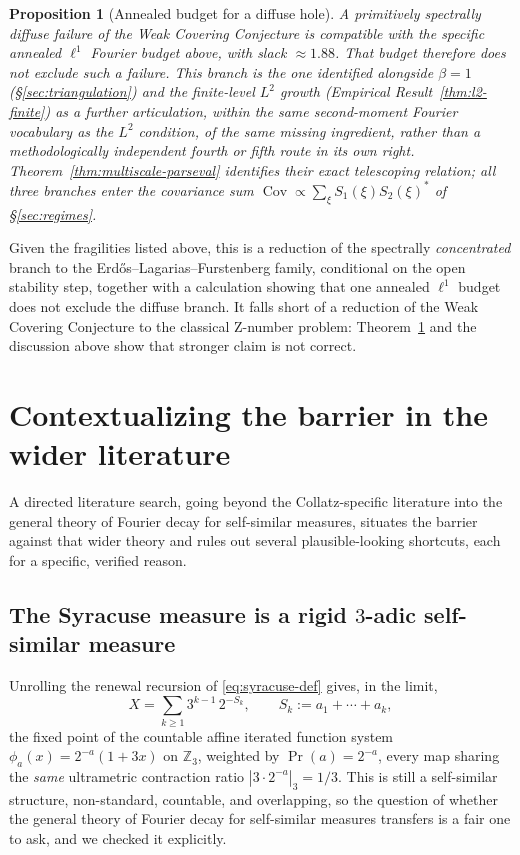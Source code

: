 \documentclass[11pt]{article}
\newtheorem{proposition}[theorem]{Proposition}
\theoremstyle{definition}
\theoremstyle{remark}
\DeclareMathOperator{\Cov}{Cov}
\begin{document}
\begin{proposition}[Annealed budget for a diffuse hole]
\label{thm:propC}
A primitively spectrally diffuse failure of the Weak Covering Conjecture is
compatible with the specific annealed $\ell^1$ Fourier budget above,
with slack $\approx 1.88$. That budget therefore does not exclude such
a failure. This branch is the one identified alongside $\beta=1$
(\S\ref{sec:triangulation}) and the finite-level $L^2$ growth
(Empirical Result~\ref{thm:l2-finite}) as a further articulation,
within the same second-moment Fourier vocabulary as the $L^2$
condition, of the same missing ingredient, rather than a
methodologically independent fourth or fifth route in its own right.
Theorem~\ref{thm:multiscale-parseval} identifies their exact
telescoping relation; all three branches enter the covariance sum
$\Cov\propto\sum_\xi S_1(\xi)S_2(\xi)^\ast$ of \S\ref{sec:regimes}.
\end{proposition}

Given the fragilities listed above, this is a reduction of the
spectrally \emph{concentrated} branch to the Erdős--Lagarias--Furstenberg
family, conditional on the open stability step, together with a
calculation showing that one annealed $\ell^1$ budget does not exclude
the diffuse branch. It falls short of a reduction of the Weak Covering
Conjecture to the classical Z-number problem: Theorem~\ref{thm:propC}
and the discussion above show that stronger claim is not correct.

\section{Contextualizing the barrier in the wider literature}
\label{sec:context}

A directed literature search, going beyond the Collatz-specific
literature into the general theory of Fourier decay for self-similar
measures, situates the barrier against that wider theory and rules out
several plausible-looking shortcuts, each for a specific, verified
reason.

\subsection{The Syracuse measure is a rigid $3$-adic self-similar
measure}

Unrolling the renewal recursion of \eqref{eq:syracuse-def} gives, in
the limit,
\begin{equation}\label{eq:X-selfsimilar}
  X = \sum_{k\ge1} 3^{k-1}\, 2^{-S_k}, \qquad S_k:=a_1+\cdots+a_k,
\end{equation}
the fixed point of the countable affine iterated function system
$\phi_a(x) = 2^{-a}(1+3x)$ on $\mathbb{Z}_3$, weighted by
$\Pr(a)=2^{-a}$, every map sharing the \emph{same} ultrametric
contraction ratio $|3\cdot2^{-a}|_3 = 1/3$. This is still a
self-similar structure, non-standard, countable, and overlapping, so
the
question of whether the general theory of Fourier decay for
self-similar measures \cite{BakerBanaji2026,Bremont,LiSahlsten2022}
transfers is a fair one to ask, and we checked it explicitly.
\end{document}
